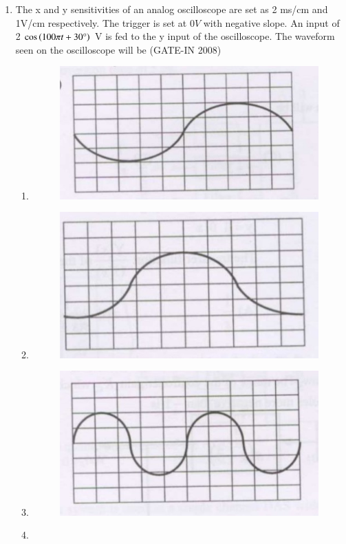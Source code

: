 \documentclass[journal,12pt,onecolumn]{IEEEtran}
\theoremstyle{remark}
\begin{document}
\begin{enumerate}
\item  The x and y sensitivities of an analog oscilloscope are set as 2 ms/cm and 1V/cm respectively. The
trigger is set at $0 V$ with negative slope. An input of 2 $\cos{\ensuremath{\left(100{\pi}t + 30\degree\right)}}$ V is fed to the y input of
the oscilloscope. The waveform seen on the oscilloscope will be \hfill{(GATE-IN 2008)}
\begin{multicols}{2}
           \begin{enumerate} 
              \item  
              \begin{figure}[H]
    \centering
    \includegraphics[width=0.5\columnwidth]{figs/i25.jpg}
    \caption{}
    \label{fig:placeholder25}
\end{figure}
              \item
              \begin{figure}[H]
    \centering
    \includegraphics[width=0.5\columnwidth]{figs/i26.jpg}
    \caption{}
    \label{fig:placeholder26}
\end{figure}
              \item
              \begin{figure}[H]
    \centering
    \includegraphics[width=0.5\columnwidth]{figs/i27.jpg}
    \caption{}
    \label{fig:placeholder27}
\end{figure}
              \item

\end{enumerate}
\end{multicols}
\end{enumerate}
\end{document}
